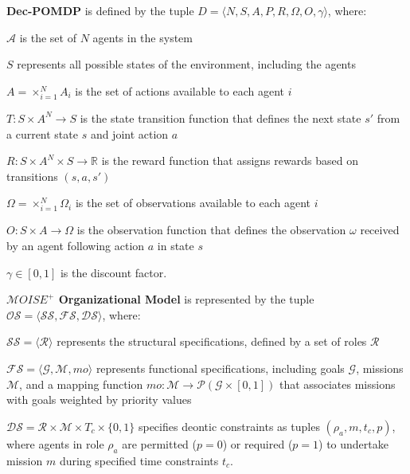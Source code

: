 \documentclass[sigconf,anonymous]{aamas}
\begin{document}
\textbf{Dec-POMDP} \quad is defined by the tuple $D = \langle N, S, A, P, R, \Omega, O, \gamma \rangle$, where:
%
\begin{itemize*}[label={},itemjoin={; }]
    \item $\mathcal{A}$ is the set of $N$ agents in the system
    \item $S$ represents all possible states of the environment, including the agents
    \item $A = \times_{i=1}^N A_i$ is the set of actions available to each agent $i$
    \item $T: S \times A^N \to S$ is the state transition function that defines the next state $s'$ from a current state $s$ and joint action $a$
    \item $R: S \times A^N \times S \to \mathbb{R}$ is the reward function that assigns rewards based on transitions $(s, a, s')$
    \item $\Omega = \times_{i=1}^N \Omega_i$ is the set of observations available to each agent $i$
    \item $O: S \times A \to \Omega$ is the observation function that defines the observation $\omega$ received by an agent following action $a$ in state $s$
    \item $\gamma \in [0, 1]$ is the discount factor.
\end{itemize*}

\textbf{$\mathcal{M}OISE^+$ Organizational Model} \quad is represented by the tuple $\mathcal{OS} = \langle \mathcal{SS}, \mathcal{FS}, \mathcal{DS} \rangle$, where:
\begin{itemize*}[label={},itemjoin={; }]
    \item $\mathcal{SS} = \langle \mathcal{R} \rangle$ represents the structural specifications, defined by a set of roles $\mathcal{R}$
    \item $\mathcal{FS} = \langle \mathcal{G}, \mathcal{M}, mo \rangle$ represents functional specifications, including goals $\mathcal{G}$, missions $\mathcal{M}$, and a mapping function $mo: \mathcal{M} \to \mathcal{P}(\mathcal{G} \times [0,1])$ that associates missions with goals weighted by priority values
    \item $\mathcal{DS} = \mathcal{R} \times \mathcal{M} \times T_c \times \{0,1\}$ specifies deontic constraints as tuples $(\rho_a, m, t_c, p)$, where agents in role $\rho_a$ are permitted ($p=0$) or required ($p=1$) to undertake mission $m$ during specified time constraints $t_c$.
\end{itemize*}
\end{document}

